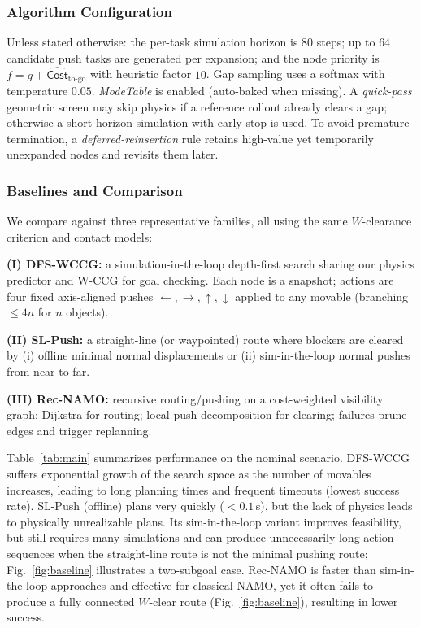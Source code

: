 \subsubsection{Algorithm Configuration}
\label{subsec:algo-config}
Unless stated otherwise: the per-task simulation horizon is $80$ steps; up to $64$ candidate push tasks are generated per expansion; and the node priority is $f=g+\widehat{\mathsf{Cost}}_{\text{to-go}}$ with heuristic factor $10$. Gap sampling uses a softmax with temperature $0.05$. \textit{ModeTable} is enabled (auto-baked when missing). A \emph{quick-pass} geometric screen may skip physics if a reference rollout already clears a gap; otherwise a short-horizon simulation with early stop is used. To avoid premature termination, a \emph{deferred-reinsertion} rule retains high-value yet temporarily unexpanded nodes and revisits them later.


\subsubsection{Baselines and Comparison}
\label{subsec:baselines}
We compare against three representative families, all using the same $W$-clearance criterion and contact models:

\textbf{(I) DFS-WCCG:} a simulation-in-the-loop depth-first search 
sharing our physics predictor and W-CCG for goal checking. 
Each node is a snapshot; actions are four fixed axis-aligned pushes 
${\leftarrow,\rightarrow,\uparrow,\downarrow}$ applied to any movable 
(branching $\le 4n$ for $n$ objects).

\textbf{(II) SL-Push:} a straight-line (or waypointed) route where blockers 
are cleared by (i) offline minimal normal displacements or 
(ii) sim-in-the-loop normal pushes from near to far.

\textbf{(III) Rec-NAMO:} recursive routing/pushing on a cost-weighted visibility graph: 
Dijkstra for routing; local push decomposition for clearing; 
failures prune edges and trigger replanning.

Table~\ref{tab:main} summarizes performance on the nominal scenario. 
DFS-WCCG suffers exponential growth of the search space as the number of movables increases, 
leading to long planning times and frequent timeouts (lowest success rate). 
SL-Push (offline) plans very quickly ($<0.1$\,s), 
but the lack of physics leads to physically unrealizable plans. 
Its sim-in-the-loop variant improves feasibility, 
but still requires many simulations and can produce unnecessarily 
long action sequences when the straight-line route is not the minimal pushing route; 
Fig.~\ref{fig:baseline} illustrates a two-subgoal case. Rec-NAMO is faster than 
sim-in-the-loop approaches and effective for classical NAMO, 
yet it often fails to produce a fully connected $W$-clear route (Fig.~\ref{fig:baseline}), 
resulting in lower success. 

